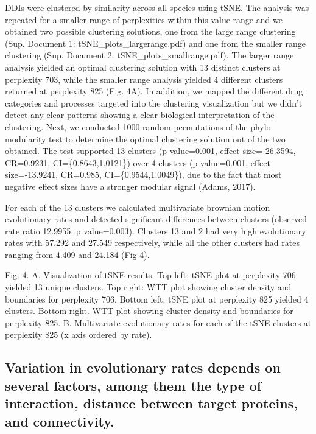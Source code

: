 \documentclass[]{elsarticle} %
\begin{document}
DDIs were clustered by similarity across all species using tSNE. The analysis was repeated for a smaller range of perplexities within this value range and we obtained two possible clustering solutions, one from the large range clustering (Sup. Document 1: tSNE\_plots\_largerange.pdf) and one from the smaller range clustering (Sup. Document 2: tSNE\_plots\_smallrange.pdf). The larger range analysis yielded an optimal clustering solution with 13 distinct clusters at perplexity 703, while the smaller range analysis yielded 4 different clusters returned at perplexity 825 (Fig. 4A). In addition, we mapped the different drug categories and processes targeted into the clustering visualization but we didn't detect any clear patterns showing a clear biological interpretation of the clustering. Next, we conducted 1000 random permutations of the phylo modularity test to determine the optimal clustering solution out of the two obtained. The test supported 13 clusters (p value=0.001, effect size=-26.3594, CR=0.9231, CI=\{0.8643,1.0121\}) over 4 clusters (p value=0.001, effect size=-13.9241, CR=0.985, CI=\{0.9544,1.0049\}), due to the fact that most negative effect sizes have a stronger modular signal (Adams, 2017).

For each of the 13 clusters we calculated multivariate brownian motion evolutionary rates and detected significant differences between clusters (observed rate ratio 12.9955, p value=0.003). Clusters 13 and 2 had very high evolutionary rates with 57.292 and 27.549 respectively, while all the other clusters had rates ranging from 4.409 and 24.184 (Fig 4).

Fig. 4. A. Visualization of tSNE results. Top left: tSNE plot at perplexity 706 yielded 13 unique clusters. Top right: WTT plot showing cluster density and boundaries for perplexity 706. Bottom left: tSNE plot at perplexity 825 yielded 4 clusters. Bottom right. WTT plot showing cluster density and boundaries for perplexity 825. B. Multivariate evolutionary rates for each of the tSNE clusters at perplexity 825 (x axis ordered by rate).

\hypertarget{variation-in-evolutionary-rates-depends-on-several-factors-among-them-the-type-of-interaction-distance-between-target-proteins-and-connectivity.}{%
\subsection{Variation in evolutionary rates depends on several factors, among them the type of interaction, distance between target proteins, and connectivity.}\label{variation-in-evolutionary-rates-depends-on-several-factors-among-them-the-type-of-interaction-distance-between-target-proteins-and-connectivity.}}
\end{document}
